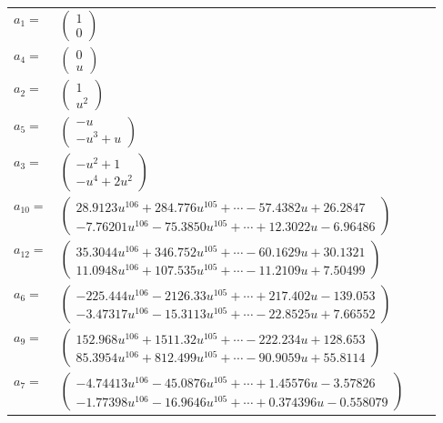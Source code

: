 \documentclass[1p]{elsarticle_modified}
\theoremstyle{definition}
\begin{document}
\begin{tabular}{m{7pt} m{180pt} m{7pt} m{180pt} }
\flushright $a_{1}=$&$\begin{pmatrix}1\\0\end{pmatrix}$ \\
\flushright $a_{4}=$&$\begin{pmatrix}0\\u\end{pmatrix}$ \\
\flushright $a_{2}=$&$\begin{pmatrix}1\\u^2\end{pmatrix}$ \\
\flushright $a_{5}=$&$\begin{pmatrix}- u\\- u^3+u\end{pmatrix}$ \\
\flushright $a_{3}=$&$\begin{pmatrix}- u^2+1\\- u^4+2 u^2\end{pmatrix}$ \\
\flushright $a_{10}=$&$\begin{pmatrix}28.9123 u^{106}+284.776 u^{105}+\cdots-57.4382 u+26.2847\\-7.76201 u^{106}-75.3850 u^{105}+\cdots+12.3022 u-6.96486\end{pmatrix}$ \\
\flushright $a_{12}=$&$\begin{pmatrix}35.3044 u^{106}+346.752 u^{105}+\cdots-60.1629 u+30.1321\\11.0948 u^{106}+107.535 u^{105}+\cdots-11.2109 u+7.50499\end{pmatrix}$ \\
\flushright $a_{6}=$&$\begin{pmatrix}-225.444 u^{106}-2126.33 u^{105}+\cdots+217.402 u-139.053\\-3.47317 u^{106}-15.3113 u^{105}+\cdots-22.8525 u+7.66552\end{pmatrix}$ \\
\flushright $a_{9}=$&$\begin{pmatrix}152.968 u^{106}+1511.32 u^{105}+\cdots-222.234 u+128.653\\85.3954 u^{106}+812.499 u^{105}+\cdots-90.9059 u+55.8114\end{pmatrix}$ \\
\flushright $a_{7}=$&$\begin{pmatrix}-4.74413 u^{106}-45.0876 u^{105}+\cdots+1.45576 u-3.57826\\-1.77398 u^{106}-16.9646 u^{105}+\cdots+0.374396 u-0.558079\end{pmatrix}$ \\

\end{tabular}
\end{document}
